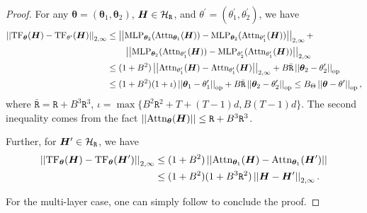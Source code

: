\begin{proof}
    For any $\bm{\theta} = ( \bm{\theta}_1, \bm{\theta}_2 )$, 
    $\bm{H} \in \mathcal{H}_{\mathtt{R}}$, and $\theta^\prime = (\theta^\prime_1, \theta^\prime_2)$, we have
    \begin{align*}
        \left\lvert \left\lvert
        \text{TF}_{\bm{\theta}}(\bm{H})
        -
        \text{TF}_{\theta^\prime}(\bm{H})
        \right\rvert \right\rvert_{2, \infty}
        &\leq
        \left\lvert \left\lvert
        \text{MLP}_{\bm{\theta}_2}
        (
        \text{Attn}_{\bm{\theta}_1}
        (\bm{H})
        )
        -
        \text{MLP}_{\bm{\theta}_2}
        (
        \text{Attn}_{\theta^\prime_1}
        (\bm{H})
        )
        \right\rvert \right\rvert_{2, \infty}
        +
        \\
        &\quad\quad
        \left\lvert \left\lvert
        \text{MLP}_{\bm{\theta}_2}
        (
        \text{Attn}_{\theta^\prime_1}
        (\bm{H})
        )
        -
        \text{MLP}_{\theta^\prime_2}
        (
        \text{Attn}_{\theta^\prime_1}
        (\bm{H})
        )
        \right\rvert \right\rvert_{2, \infty}
        \\
        &\leq
        (1 + B^2)
        \left\lvert \left\lvert
        \text{Attn}_{\theta^\prime_1}
        (\bm{H})
        -
        \text{Attn}_{\theta^\prime_1}
        (\bm{H})
        \right\rvert \right\rvert_{2, \infty}
        +
        B \bar{\mathtt{R}}
        \left\lvert \left\lvert \bm{\theta}_2 - \theta_2^\prime \right\rvert \right\rvert_{\text{op}}
        \\
        &\leq
        (1 + B^2) ( 1 + \iota ) \left\lvert \left\lvert\bm{\theta}_1 - \theta_1^\prime\right\rvert \right\rvert_{\text{op}}
        +
        B \bar{\mathtt{R}}
        \left\lvert \left\lvert\bm{\theta}_2 - \theta_2^\prime\right\rvert \right\rvert_{\text{op}}
        \leq 
        B_{\Theta} \left\lvert \left\lvert\bm{\theta} - \theta^\prime\right\rvert \right\rvert_{\text{op}},
    \end{align*}
    where $\bar{\mathtt{R}} = \mathtt{R} + B^3 \mathtt{R}^3$, $\iota = \max \{  B^2\mathtt{R}^2 +T + (T-1)d, B(T-1)d  \}$.
    The second inequality comes from the fact $\left\lvert \left\lvert\text{Attn}_{\bm{\theta}}(\bm{H})\right\rvert \right\rvert \leq \mathtt{R} + B^3 \mathtt{R}^3$.

    Further, for $\bm{H}^\prime \in \mathcal{H}_{\mathtt{R}}$, we have
    \begin{align*}
    \left\lvert \left\lvert
        \text{TF}_{\bm{\theta}}(\bm{H})  
        -
        \text{TF}_{\bm{\theta}}(\bm{H}^\prime)
    \right\rvert \right\rvert_{2, \infty}
    &\leq 
    (1 + B^2) \left\lvert \left\lvert
    \text{Attn}_{\bm{\theta}_1}(\bm{H})
    -
    \text{Attn}_{\bm{\theta}_1}(\bm{H}^\prime)
    \right\rvert \right\rvert
    \\
    &\leq
    (1 + B^2)(1 + B^3 \mathtt{R}^2 ) \left\lvert \left\lvert
    \bm{H} - \bm{H}^\prime
    \right\rvert \right\rvert_{2, \infty}.
    \end{align*}

    For the multi-layer case, one can simply follow \citep[Proposition~J.1]{bai2024transformers} to conclude the proof.
    
\end{proof}


